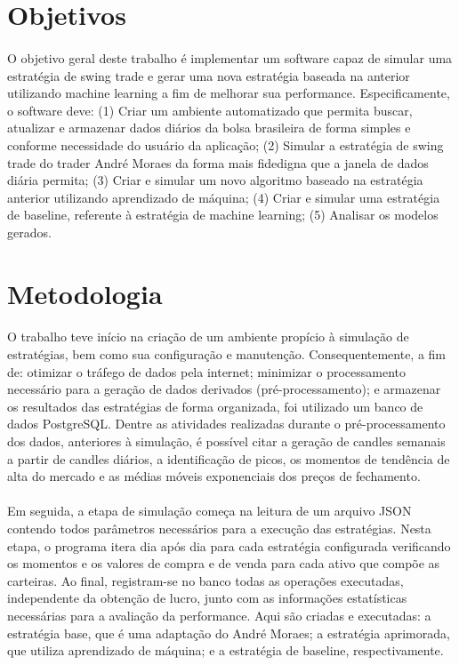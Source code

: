 \section{Objetivos}

\paragraph{} O objetivo geral deste trabalho é implementar um software capaz de simular uma estratégia de swing trade e gerar uma nova estratégia baseada na anterior utilizando machine learning a fim de melhorar sua performance. Especificamente, o software deve: (1) Criar um ambiente automatizado que permita buscar, atualizar e armazenar dados diários da bolsa brasileira de forma simples e conforme necessidade do usuário da aplicação; (2) Simular a estratégia de swing trade do trader André Moraes da forma mais fidedigna que a janela de dados diária permita; (3) Criar e simular um novo algoritmo baseado na estratégia anterior utilizando aprendizado de máquina; (4) Criar e simular uma estratégia de baseline, referente à estratégia de machine learning; (5) Analisar os modelos gerados.

\section{Metodologia}

\paragraph{} O trabalho teve início na criação de um ambiente propício à simulação de estratégias, bem como sua configuração e manutenção. Consequentemente, a fim de: otimizar o tráfego de dados pela internet; minimizar o processamento necessário para a geração de dados derivados (pré-processamento); e armazenar os resultados das estratégias de forma organizada, foi utilizado um banco de dados PostgreSQL. Dentre as atividades realizadas durante o pré-processamento dos dados, anteriores à simulação, é possível citar a geração de candles semanais a partir de candles diários, a identificação de picos, os momentos de tendência de alta do mercado e as médias móveis exponenciais dos preços de fechamento.

\paragraph{} Em seguida, a etapa de simulação começa na leitura de um arquivo JSON contendo todos parâmetros necessários para a execução das estratégias. Nesta etapa, o programa itera dia após dia para cada estratégia configurada verificando os momentos e os valores de compra e de venda para cada ativo que compõe as carteiras. Ao final, registram-se no banco todas as operações executadas, independente da obtenção de lucro, junto com as informações estatísticas necessárias para a avaliação da performance. Aqui são criadas e executadas: a estratégia base, que é uma adaptação do André Moraes; a estratégia aprimorada, que utiliza aprendizado de máquina; e a estratégia de baseline, respectivamente.

